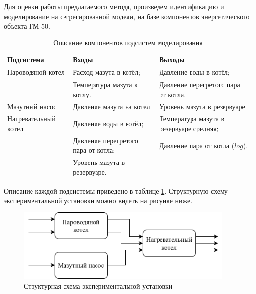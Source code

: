 Для оценки работы предлагаемого метода, произведем идентификацию и моделирование
на сегрегированной модели, на базе компонентов энергетического объекта ГМ-50. 

\begin{table}[H]
\caption{Описание компонентов подсистем моделирования}\label{tab:subsystems}
\begin{tabular}{|p{}|p{}|p{}|}
    \hline
    Подсистема  & Входы & Выходы \\
    \hline 
    Пароводяной котел & Расход мазута в котёл;  & Давление воды в котёл; \\
                      & Температура мазута к котлу. & Давление перегретого пара
                      от котла. \\
    \hline 
    Мазутный насос    & Давление мазута на котел & Уровень мазута в резервуаре
    \\
    \hline
    Нагревательный котел & Давление воды в котёл; & Температура мазута в
    резервуаре средняя;\\
                         & Давление перегретого пара от котла; & Давление пара
                         от котла ($log$).\\
                         & Уровень мазута в резервуаре. & \\
    \hline
\end{tabular}
\end{table}

Описание каждой подсистемы приведено в таблице \ref{tab:subsystems}. Структурную
схему экспериментальной установки можно видеть на рисунке ниже. 

\begin{figure}[H]
  \begin{center}
    \includegraphics[width=0.95\textwidth]{figures/subsystem_diagram.png}
  \end{center}
  \caption{Структурная схема экспериментальной
  установки}\label{fig:subsystem_diagram}
\end{figure}

